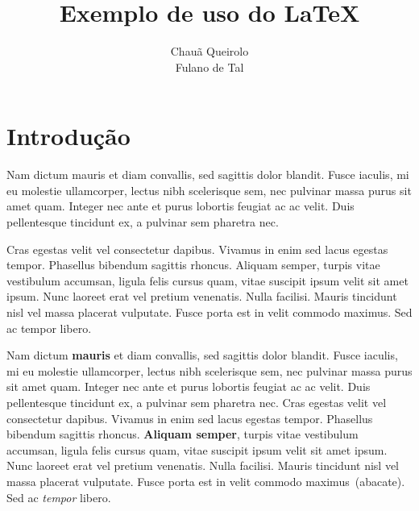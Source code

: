 \documentclass[11pt,twocolumn]{article}
\title{Exemplo de uso do \LaTeX}
\author{Chauã Queirolo\\Fulano de Tal}
\begin{document}
 
\maketitle
\tableofcontents


\section{Introdução}
\label{sec_introducao}

Nam dictum mauris et diam convallis, sed sagittis dolor blandit. Fusce iaculis, mi eu molestie ullamcorper, lectus nibh scelerisque sem, nec pulvinar massa purus sit amet quam. Integer nec ante et purus lobortis feugiat ac ac velit. Duis pellentesque tincidunt ex, a pulvinar sem pharetra nec. 

Cras egestas velit vel consectetur dapibus. Vivamus in enim sed lacus egestas tempor. Phasellus bibendum sagittis rhoncus. Aliquam semper, turpis vitae vestibulum accumsan, ligula felis cursus quam, vitae suscipit ipsum velit sit amet ipsum. Nunc laoreet erat vel pretium venenatis. Nulla facilisi. Mauris tincidunt nisl vel massa placerat vulputate. Fusce porta est in velit commodo maximus. Sed ac tempor libero.

Nam dictum \textbf{mauris} et diam convallis, sed sagittis dolor blandit. Fusce iaculis, mi eu molestie ullamcorper, lectus nibh scelerisque sem, nec pulvinar massa purus sit amet quam. Integer nec ante et purus lobortis feugiat ac ac velit. Duis pellentesque tincidunt ex, a pulvinar sem pharetra nec. Cras egestas velit vel consectetur dapibus. Vivamus in enim sed lacus egestas tempor. Phasellus bibendum sagittis rhoncus. \textbf{Aliquam semper}, turpis vitae vestibulum accumsan, ligula felis cursus quam, vitae suscipit ipsum velit sit amet ipsum. Nunc laoreet erat vel pretium venenatis. Nulla facilisi. Mauris tincidunt nisl vel massa placerat vulputate. Fusce porta est in velit commodo maximus~(abacate). Sed ac \textit{tempor} libero.
\end{document}
